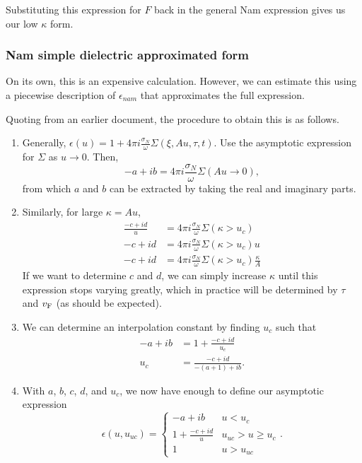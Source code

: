 \documentclass[../main.tex]{subfiles}
\begin{document}
	Substituting this expression for $F$ back in the general Nam expression gives us our low $\kappa$ form.

	\subsubsection{Nam simple dielectric approximated form}

	On its own, this is an expensive calculation.
	However, we can estimate this using a piecewise description of $\epsilon_{nam}$ that approximates the full expression.

	Quoting from an earlier document, the procedure to obtain this is as follows.
	\begin{enumerate}
		\item Generally, $\epsilon(u) = 1 + 4 \pi i \frac{\sigma_N}{\omega} \Sigma(\xi, A u, \tau, t)$.
		Use the asymptotic expression for $\Sigma$ as $u \rightarrow 0$.
		Then,
		\begin{equation}
			-a + ib = 4 \pi i \frac{\sigma_N}{\omega} \Sigma(A u \rightarrow 0),
		\end{equation}
		from which $a$ and $b$ can be extracted by taking the real and imaginary parts.
		\item Similarly, for large $\kappa = A u$,
		\begin{align}
			\frac{-c + i d}{u} &= 4 \pi i \frac{\sigma_N}{\omega} \Sigma(\kappa > u_c) \\
			- c + i d &= 4 \pi i \frac{\sigma_N}{\omega} \Sigma(\kappa > u_c) u \\
			- c + i d &= 4 \pi i \frac{\sigma_N}{\omega} \Sigma(\kappa > u_c) \frac{\kappa}{A}
		\end{align}
		If we want to determine $c$ and $d$, we can simply increase $\kappa$ until this expression stops varying greatly, which in practice will be determined by $\tau$ and $v_{\mathrm{F}}$ (as should be expected).
		\item We can determine an interpolation constant by finding $u_c$ such that
		\begin{align}
			-a + ib &= 1 + \frac{-c + id}{u_c} \\
			u_c &= \frac{-c + id}{-(a + 1) + ib}.
		\end{align}
		\item With $a$, $b$, $c$, $d$, and $u_c$, we now have enough to define our asymptotic expression
		\begin{equation}
			\epsilon(u, u_{uc}) =
			\begin{cases}
				-a + i b & u < u_c \\
				1 + \frac{-c + i d}{u} &  u_{uc} > u \geq u_c \\
				1 & u > u_{uc}
			\end{cases}.
		\end{equation}

	\end{enumerate}
\end{document}
